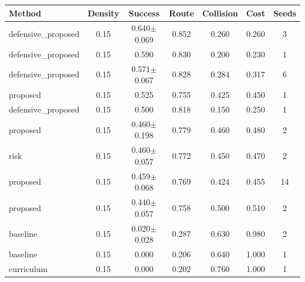 \begin{tabular}{lcccccc}
\toprule
Method & Density & Success & Route & Collision & Cost & Seeds \\ 
\midrule
defensive_proposed & 0.15 & 0.640$\pm$0.069 & 0.852 & 0.260 & 0.260 & 3 \\ 
defensive_proposed & 0.15 & 0.590 & 0.830 & 0.200 & 0.230 & 1 \\ 
defensive_proposed & 0.15 & 0.571$\pm$0.067 & 0.828 & 0.284 & 0.317 & 6 \\ 
proposed & 0.15 & 0.525 & 0.755 & 0.425 & 0.450 & 1 \\ 
defensive_proposed & 0.15 & 0.500 & 0.818 & 0.150 & 0.250 & 1 \\ 
proposed & 0.15 & 0.460$\pm$0.198 & 0.779 & 0.460 & 0.480 & 2 \\ 
risk & 0.15 & 0.460$\pm$0.057 & 0.772 & 0.450 & 0.470 & 2 \\ 
proposed & 0.15 & 0.459$\pm$0.068 & 0.769 & 0.424 & 0.455 & 14 \\ 
proposed & 0.15 & 0.440$\pm$0.057 & 0.758 & 0.500 & 0.510 & 2 \\ 
baseline & 0.15 & 0.020$\pm$0.028 & 0.287 & 0.630 & 0.980 & 2 \\ 
baseline & 0.15 & 0.000 & 0.206 & 0.640 & 1.000 & 1 \\ 
curriculum & 0.15 & 0.000 & 0.202 & 0.760 & 1.000 & 1 \\ 
\bottomrule
\end{tabular}

